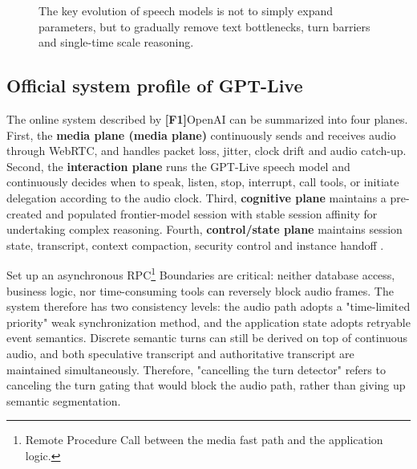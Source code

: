 \documentclass[UTF8,fontset=none,a4paper,10pt]{ctexart}
\newcommand{\FOne}{\textcolor{official}{\textbf{[F1]}}}
\begin{document}
\begin{figure}[H]
\centering
{}
\caption{The key evolution of speech models is not to simply expand parameters, but to gradually remove text bottlenecks, turn barriers and single-time scale reasoning.}
\label{fig:evolution}
\end{figure}

\subsection{Official system profile of GPT-Live}

The online system described by \FOne OpenAI can be summarized into four planes. First, the \textbf{ media plane (media plane) } continuously sends and receives audio through WebRTC, and handles packet loss, jitter, clock drift and audio catch-up. Second, the \textbf{ interaction plane } runs the GPT-Live speech model and continuously decides when to speak, listen, stop, interrupt, call tools, or initiate delegation according to the audio clock. Third, \textbf{ cognitive plane } maintains a pre-created and populated frontier-model session with stable session affinity for undertaking complex reasoning. Fourth, \textbf{ control/state plane } maintains session state, transcript, context compaction, security control and instance handoff \cite{openai2026continuous,openai2026safety}.

Set up an asynchronous RPC\footnote{Remote Procedure Call between the media fast path and the application logic. } Boundaries are critical: neither database access, business logic, nor time-consuming tools can reversely block audio frames. The system therefore has two consistency levels: the audio path adopts a "time-limited priority" weak synchronization method, and the application state adopts retryable event semantics. Discrete semantic turns can still be derived on top of continuous audio, and both speculative transcript and authoritative transcript are maintained simultaneously. Therefore, "cancelling the turn detector" refers to canceling the turn gating that would block the audio path, rather than giving up semantic segmentation.
\end{document}
